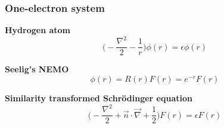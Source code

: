 \begin{frame}
\frametitle{One-electron system}
\centering
\scriptsize

\textbf{Hydrogen atom}
\begin{equation}
    \nonumber
    \bigg(-\frac{\nabla^2}{2} - \frac{1}{r} \bigg)\phi(r) = \epsilon \phi(r)
\end{equation}

\pause
\vspace{10mm}

\textbf{Seelig's NEMO}
\begin{equation}
    \nonumber
    \phi(r) = R(r)F(r) = e^{-r}F(r)
\end{equation}

\pause
\vspace{10mm}

\textbf{Similarity transformed Schr\"{o}dinger equation}
\begin{equation}
    \nonumber
    \bigg(-\frac{\nabla^2}{2} + \vec{n}\cdot\vec{\nabla} + \frac{1}{2}\bigg)F(r) =
    \epsilon F(r)
\end{equation}

\end{frame}

